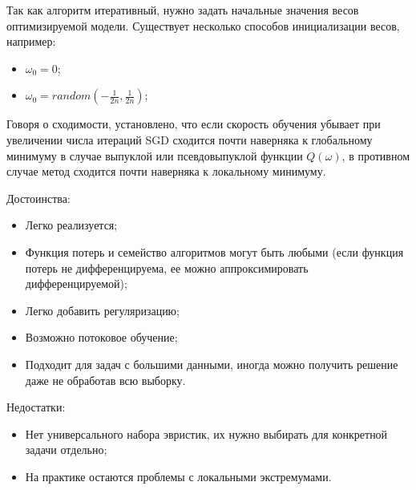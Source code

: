 \documentclass[11pt, oneside]{article}   	%
\begin{document}
Так как алгоритм итеративный, нужно задать начальные значения весов оптимизируемой модели. Существует несколько способов инициализации весов, например:

\begin{itemize}
	\item $ \omega_0 = 0 $;
	\item $ \omega_0 = random(-\frac{1}{2n}, \frac{1}{2n}) $;
\end{itemize}

Говоря о сходимости, установлено, что если скорость обучения убывает при увеличении числа итераций SGD сходится почти наверняка к глобальному минимуму в случае выпуклой или псевдовыпуклой функции $ Q(\omega) $, в противном случае метод сходится почти наверняка к локальному минимуму.


Достоинства:
\begin{itemize}
	\item Легко реализуется;
	\item Функция потерь и семейство алгоритмов могут быть любыми (если функция потерь не дифференцируема, ее можно аппроксимировать дифференцируемой);
	\item Легко добавить регуляризацию;
	\item Возможно потоковое обучение;
	\item Подходит для задач с большими данными, иногда можно получить решение даже не обработав всю выборку.
\end{itemize}

Недостатки:
\begin{itemize}
	\item Нет универсального набора эвристик, их нужно выбирать для конкретной задачи отдельно;
	\item На практике остаются проблемы с локальными экстремумами.
\end{itemize}
\end{document}

